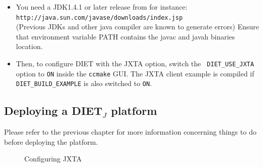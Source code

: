 \begin{itemize}
\item{You need a JDK1.4.1 or later release from for instance:\\
    \noindent
    {\footnotesize
      \texttt{http://java.sun.com/javase/downloads/index.jsp} }\\
      (Previous JDKs and other java compiler are known to generate
      errors) Ensure that environment variable PATH contains the javac
      and javah binaries location.}
  
\item{Then, to configure DIET with the JXTA option, switch the {\tt
    DIET\_USE\_JXTA} option to {\tt ON} inside the {\tt ccmake}
    GUI. The JXTA client example is compiled if {\tt
    DIET\_BUILD\_EXAMPLE} is also switched to {\tt ON}.}

\end{itemize}

\subsection {Deploying a DIET$_{J}$ platform}
\label{ssec:deployjxta}



Please refer to the previous chapter for more information concerning
things to do before deploying the platform.

\begin{figure}[htb]
 \begin{center}
  \caption{Configuring JXTA \label{fig:platform}}
 \end{center}
\end{figure}



